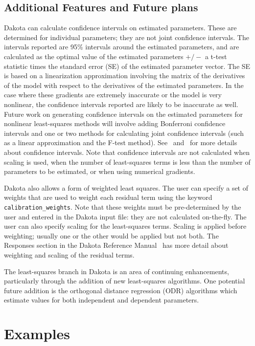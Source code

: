 \subsection{Additional Features and Future plans}\label{nls:solution:future}

Dakota can calculate confidence intervals on estimated parameters.
These are determined for individual parameters; they are not joint
confidence intervals.  The intervals reported are 95\% intervals
around the estimated parameters, and are calculated as the optimal
value of the estimated parameters $+/-$ a t-test statistic times the
standard error (SE) of the estimated parameter vector.  The SE is
based on a linearization approximation involving the matrix of the
derivatives of the model with respect to the derivatives of the
estimated parameters.  In the case where these gradients are extremely
inaccurate or the model is very nonlinear, the confidence intervals
reported are likely to be inaccurate as well.  Future work on
generating confidence intervals on the estimated parameters for
nonlinear least-squares methods will involve adding Bonferroni
confidence intervals and one or two methods for calculating joint
confidence intervals (such as a linear approximation and the F-test
method). See~\cite{Seb03} and~\cite{Vug07} for more details about
confidence intervals. Note that confidence intervals are not
calculated when scaling is used, when the number of least-squares
terms is less than the number of parameters to be estimated, or when
using numerical gradients.

Dakota also allows a form of weighted least squares.  The user can
specify a set of weights that are used to weight each residual term
using the keyword \texttt{calibration\_weights}.  Note that these
weights must be pre-determined by the user and entered in the Dakota
input file: they are not calculated on-the-fly.  The user can also
specify scaling for the least-squares terms.  Scaling is applied
before weighting; usually one or the other would be applied but not
both.  The Responses section in the Dakota Reference
Manual~\cite{RefMan} has more detail about weighting and scaling of
the residual terms.

The least-squares branch in Dakota is an area of continuing
enhancements, particularly through the addition of new least-squares
algorithms. One potential future addition is the orthogonal distance
regression (ODR) algorithms which estimate values for both independent
and dependent parameters.

\section{Examples}\label{nls:examples}

